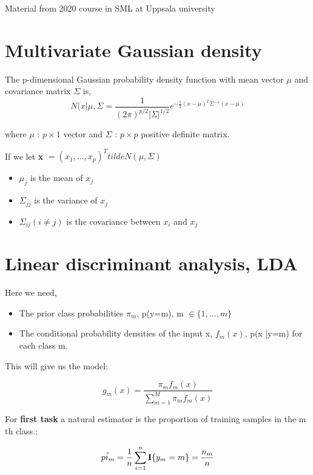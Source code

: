 Material from 2020 course in SML at Uppsala university 

\section{Multivariate Gaussian density}

The p-dimensional Gaussian probability density function with mean vector $\mu$ and covariance matrix $\Sigma$ is, 
\begin{equation}
N(x| \mu, \Sigma= \frac{1} {(2\pi)^{p/2}|\Sigma|^{1/2}}e^{-\frac{1} {2} (x-\mu)^{T}\Sigma^{-1}(x-\mu)} 
\end{equation}

where $\mu$ : $p \times 1$ vector and $\Sigma$ : $p \times p$ positive definite matrix.

If we let \textbf{x} $= (x_1, \ldots, x_p)^{T}  tilde N(\mu,\Sigma)$ 

\begin{itemize}
	\item $\mu_j$ is the mean of $x_j$
	\item $\Sigma_{jj}$ is the variance of $x_j$
	\item $\Sigma_{ij} (i \neq j)$ is the covariance between $x_i$ and $x_j$
\end{itemize}

\section{Linear discriminant analysis, LDA}
Here we need,
\begin{itemize}
	\item The prior class probabilities $\pi_m$, p(y=m), m $\in \{1,...,m\} $
	\item The conditional probability densities of the input x, $f_m(x)$, p(x |y=m) for each class m. 
\end{itemize}

This will give us the model:

\begin{equation}
g_m(x) = \frac{\pi_mf_m(x)} {\sum_{m=1}^{M} \pi_mf_m(x)} 
\end{equation}

For \textbf{first task} a natural estimator is the proportion of training samples in the m th class.:

\begin{equation}
\hat{pi_m}=\frac{1} {n} \sum_{i=1}^{n} \text{\textbf{I}} \{ y_m = m\} = \frac{n_m} {n} 
\end{equation}

